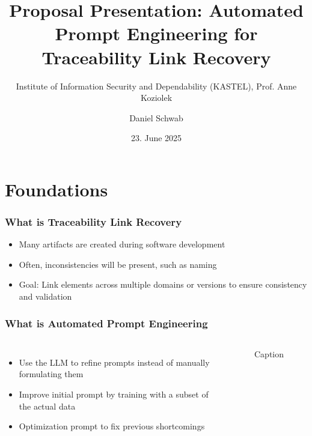 \documentclass{sdqbeamer}
\title[Automated Prompt Engineering for Traceability Link Recovery]{Proposal Presentation: Automated Prompt Engineering for Traceability Link Recovery}
\subtitle{Institute of Information Security and Dependability (KASTEL), Prof. Anne Koziolek}
\author{Daniel Schwab}
\date[23.\,06.\,2025]{23. June 2025}
\begin{document}
\begin{frame}[title white horizontal, picture=images/palladio_bauplan, kitlogo=white]
\titlepage
\end{frame}



\section{Foundations}


\begin{frame}[picture 50 vertical, picture=images/artifact_overview_Fuchß.png]
\frametitle{What is Traceability Link Recovery}
	\begin{itemize}
		\item Many artifacts are created during software development
            \item Often, inconsistencies will be present, such as naming
            \item Goal: Link elements across multiple domains or versions to ensure consistency and validation
	\end{itemize}
\end{frame}

\begin{frame}
\frametitle{What is Automated Prompt Engineering}
    \begin{columns}
            \begin{itemize}
		\item Use the LLM to refine prompts instead of manually formulating them
            \item Improve initial prompt by training with a subset of the actual data
            \item Optimization prompt to fix previous shortcomings
	   \end{itemize} 
            \begin{figure}
            \centering
            
            \caption{Caption}
            \label{fig:enter-label}
            \end{figure}
    \end{columns}
    
\end{frame}
\end{document}

